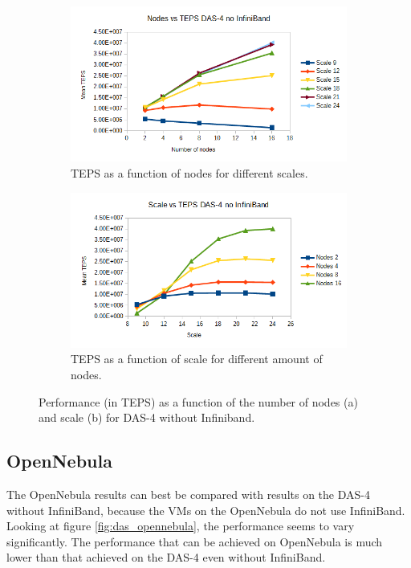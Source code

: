 \begin{figure}[!h]
\centering
\begin{subfigure}{.5\textwidth}
  \centering
  \includegraphics[width=\linewidth]{images/nodes_no_infini.png}
  \caption{TEPS as a function of nodes for different scales.}
  \label{fig:nodes_no_infini}
\end{subfigure}%
\begin{subfigure}{.5\textwidth}
  \centering
  \includegraphics[width=\linewidth]{images/scale_no_infini.png}
  \caption{TEPS as a function of scale for different amount of nodes.}
  \label{fig:scale_no_infini}
\end{subfigure}
\caption{Performance (in TEPS) as a function of the number of nodes (a) and scale (b) for DAS-4 without Infiniband.}
\label{fig:das_no_infini}
\end{figure}

\subsection{OpenNebula}
The OpenNebula results can best be compared with results on the DAS-4 without InfiniBand, because the VMs on the OpenNebula do not use InfiniBand.
Looking at figure \ref{fig:das_opennebula}, the performance seems to vary significantly. The performance that can be achieved on OpenNebula is much lower than that achieved on the DAS-4 even  without InfiniBand. 

